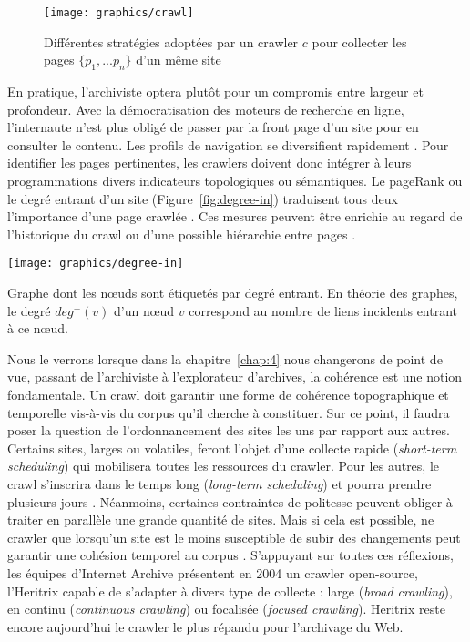 \documentclass[symmetric,justified,marginals=raggedouter]{tufte-book}
\begin{document}
\begin{figure*}%
  \texttt{[image: graphics/crawl]}
  \caption{Différentes stratégies adoptées par un crawler $c$ pour collecter les pages $\{p_1,...p_n\}$ d'un même site}
  \label{fig:crawl}
\end{figure*}

\noindent En pratique, l'archiviste optera plutôt pour un compromis entre largeur et profondeur. Avec la démocratisation des moteurs de re\-cherche en ligne, l'internaute n'est plus obligé de passer par la front page d'un site pour en consulter le contenu. Les profils de navigation se diversifient rapidement \citep{holscher_web_2000}. Pour identifier les pages pertinentes, les crawlers doivent donc intégrer à leurs programmations divers indicateurs topologiques ou sémantiques. Le pageRank \citep{page_pagerank_1999} ou le degré entrant d'un site (Figure~\ref{fig:degree-in}) traduisent tous deux l'importance d'une page crawlée \citep{cho_efficient_1998}. Ces mesures peuvent être enrichie au regard de l'historique du crawl ou d'une possible hiérarchie entre pages \citep{baeza-yates_crawling_2005}. 

\begin{marginfigure}%
  \texttt{[image: graphics/degree-in]}
  \caption{Graphe dont les nœuds sont étiquetés par degré entrant. En théorie des graphes, le degré $deg^-(v)$ d'un nœud $v$ correspond au nombre de liens incidents entrant à ce nœud.}
  \label{fig:degree-in}
\end{marginfigure} 

Nous le verrons lorsque dans la chapitre~\ref{chap:4} nous changerons de point de vue, passant de l'archiviste à l'explorateur d'archives, la cohérence est une notion fondamentale. Un crawl doit garantir une forme de cohérence topographique et temporelle vis-à-vis du corpus qu'il cherche à constituer. Sur ce point, il faudra poser la question de l'ordonnancement des sites les uns par rapport aux autres. Certains sites, larges ou volatiles, feront l'objet d'une collecte rapide (\textit{short-term scheduling}) qui mobilisera toutes les ressources du crawler.  Pour les autres, le crawl s'inscrira dans le temps long (\textit{long-term scheduling}) et pourra prendre plusieurs jours \citep{castillo_scheduling_2004}. Néanmoins, certaines contraintes de politesse peuvent obliger à traiter en parallèle une grande quantité de sites. Mais si cela est possible, ne crawler que lorsqu'un site est le moins susceptible de subir des changements peut garantir une cohésion temporel au corpus \citep{saad_coherence-oriented_2011}. S'appuyant sur toutes ces réflexions, les équipes d'Internet Archive présentent en 2004 un crawler open-source, l'Heritrix \citep{mohr_introduction_2004} capable de s'adapter à divers type de collecte : large (\textit{broad crawling}), en continu (\textit{continuous crawling}) ou focalisée (\textit{focused crawling}). Heritrix reste encore aujourd'hui le crawler le plus répandu pour l'archivage du Web. 
\end{document}
